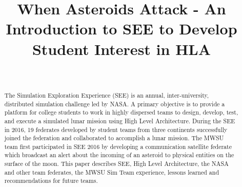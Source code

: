 \documentclass[journal, onecolumn]{IEEEtran}
\begin{document}
%
\title{When Asteroids Attack - An Introduction to SEE to Develop Student Interest in HLA}


%

\author{ \\
}

\maketitle

\begin{abstract}
The Simulation Exploration Experience (SEE) is an annual, inter-university, distributed simulation challenge led by NASA. A primary objective is to provide a platform for college students to work in highly dispersed teams to design, develop, test, and execute a simulated lunar mission using High Level Architecture. During the SEE in 2016, 19 federates developed by student teams from three continents successfully joined the federation and collaborated to accomplish a lunar mission. The MWSU team first participated in SEE 2016 by developing a communication satellite federate which broadcast an alert about the incoming of an asteroid to physical entities on the surface of the moon. This paper describes SEE, High Level Architecture, the NASA and other team federates, the MWSU Sim Team experience, lessons learned and recommendations for future teams.
\end{abstract}
\end{document}

